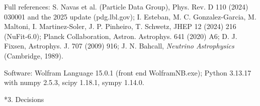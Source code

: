\documentclass[10pt,a4paper]{article}
\makeatletter
\renewcommand\section{\@startsection{section}{1}{\z@}{-3.5ex \@plus -1ex \@minus -.2ex}{2.3ex \@plus.2ex}{\normalfont\Large\bfseries\raggedright}}
\makeatother
\begin{document}
Full references: S. Navas et al. (Particle Data Group), Phys. Rev. D 110 (2024) 030001 and the 2025 update (pdg.lbl.gov); I. Esteban, M. C. Gonzalez-Garcia, M. Maltoni, I. Martinez-Soler, J. P. Pinheiro, T. Schwetz, JHEP 12 (2024) 216 (NuFit-6.0); Planck Collaboration, Astron. Astrophys. 641 (2020) A6; D. J. Fixsen, Astrophys. J. 707 (2009) 916; J. N. Bahcall, \emph{Neutrino Astrophysics} (Cambridge, 1989).

Software: Wolfram Language 15.0.1 (front end WolframNB.exe); Python 3.13.17 with numpy 2.5.3, scipy 1.18.1, sympy 1.14.0.

\section*{3. Decisions}
\end{document}
